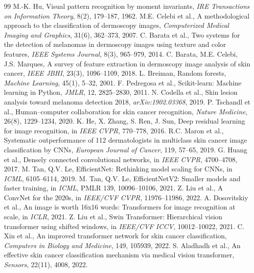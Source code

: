 \documentclass[12pt,a4paper]{article}
\begin{document}
\begin{thebibliography}{99}
 M.-K. Hu, Visual pattern recognition by moment invariants, \textit{IRE Transactions on Information Theory}, 8(2), 179--187, 1962.
 M.E. Celebi et al., A methodological approach to the classification of dermoscopy images, \textit{Computerized Medical Imaging and Graphics}, 31(6), 362--373, 2007.
 C. Barata et al., Two systems for the detection of melanomas in dermoscopy images using texture and color features, \textit{IEEE Systems Journal}, 8(3), 965--979, 2014.
 C. Barata, M.E. Celebi, J.S. Marques, A survey of feature extraction in dermoscopy image analysis of skin cancer, \textit{IEEE JBHI}, 23(3), 1096--1109, 2018.
 L. Breiman, Random forests, \textit{Machine Learning}, 45(1), 5--32, 2001.
 F. Pedregosa et al., Scikit-learn: Machine learning in Python, \textit{JMLR}, 12, 2825--2830, 2011.
 N. Codella et al., Skin lesion analysis toward melanoma detection 2018, \textit{arXiv:1902.03368}, 2019.
 P. Tschandl et al., Human--computer collaboration for skin cancer recognition, \textit{Nature Medicine}, 26(8), 1229--1234, 2020.
 K. He, X. Zhang, S. Ren, J. Sun, Deep residual learning for image recognition, in \textit{IEEE CVPR}, 770--778, 2016.
 R.C. Maron et al., Systematic outperformance of 112 dermatologists in multiclass skin cancer image classification by CNNs, \textit{European Journal of Cancer}, 119, 57--65, 2019.
 G. Huang et al., Densely connected convolutional networks, in \textit{IEEE CVPR}, 4700--4708, 2017.
 M. Tan, Q.V. Le, EfficientNet: Rethinking model scaling for CNNs, in \textit{ICML}, 6105--6114, 2019.
 M. Tan, Q.V. Le, EfficientNetV2: Smaller models and faster training, in \textit{ICML}, PMLR 139, 10096--10106, 2021.
 Z. Liu et al., A ConvNet for the 2020s, in \textit{IEEE/CVF CVPR}, 11976--11986, 2022.
 A. Dosovitskiy et al., An image is worth 16x16 words: Transformers for image recognition at scale, in \textit{ICLR}, 2021.
 Z. Liu et al., Swin Transformer: Hierarchical vision transformer using shifted windows, in \textit{IEEE/CVF ICCV}, 10012--10022, 2021.
 C. Xin et al., An improved transformer network for skin cancer classification, \textit{Computers in Biology and Medicine}, 149, 105939, 2022.
 S. Aladhadh et al., An effective skin cancer classification mechanism via medical vision transformer, \textit{Sensors}, 22(11), 4008, 2022.

\end{thebibliography}
\end{document}
